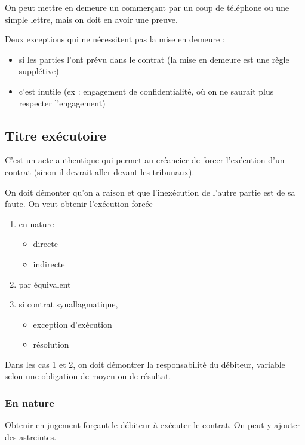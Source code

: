 		On peut mettre en demeure un commerçant par un coup de téléphone ou une simple lettre, mais on doit en avoir une preuve.
		
		Deux exceptions qui ne nécessitent pas la mise en demeure :
		
		\begin{itemize}
			\item si les parties l'ont prévu dans le contrat (la mise en demeure est une règle supplétive)
			\item c'est inutile (ex : engagement de confidentialité, où on ne saurait plus respecter l'engagement)
		\end{itemize}
		
		\subsection{Titre exécutoire}
		
		C'est un acte authentique qui permet au créancier de forcer l'exécution d'un contrat (sinon il devrait aller devant les tribunaux).
		
		On doit démonter qu'on a raison et que l'inexécution de l'autre partie est de sa faute. On veut obtenir \underline{l'exécution forcée} 
		
		\begin{enumerate}
			\item en nature
			\begin{itemize}
				\item directe
				\item indirecte
			\end{itemize}
			\item par équivalent
			\item si contrat synallagmatique,
			\begin{itemize}
				\item exception d'exécution
				\item résolution
			\end{itemize}
		\end{enumerate}
		
		Dans les cas 1 et 2, on doit démontrer la responsabilité du débiteur, variable selon une obligation de moyen ou de résultat.
		
		
			\subsubsection{En nature}
			
			Obtenir en jugement forçant le débiteur à exécuter le contrat. On peut y ajouter des astreintes.
			
